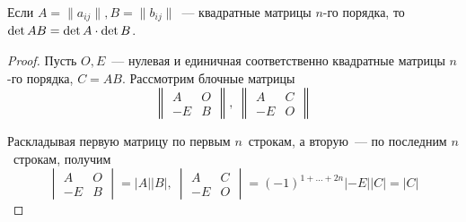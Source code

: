 \begin{theorem}
Если $A = \|a_{ij}\|, B = \|b_{ij}\|$~--- квадратные матрицы $n$-го порядка, то $\det AB \opbr= \det A \opbr\cdot \det B$.
\end{theorem}
\begin{proof}
Пусть $O, E$~--- нулевая и единичная соответственно квадратные матрицы $n$-го порядка, $C = AB$.
Рассмотрим блочные матрицы
\begin{equation*}
\begin{Vmatrix}
A & O \\
-E & B
\end{Vmatrix}, \
\begin{Vmatrix}
A & C \\
-E & O
\end{Vmatrix}
\end{equation*}

Раскладывая первую матрицу по первым $n$~строкам, а вторую~--- по последним $n$~строкам, получим
\begin{equation*}
\begin{vmatrix}
A & O \\
-E & B
\end{vmatrix} =
|A| |B|, \
\begin{vmatrix}
A & C \\
-E & O
\end{vmatrix} =
(-1)^{1 + \ldots + 2n}|-E| |C| =
|C|
\end{equation*}


\end{proof}
